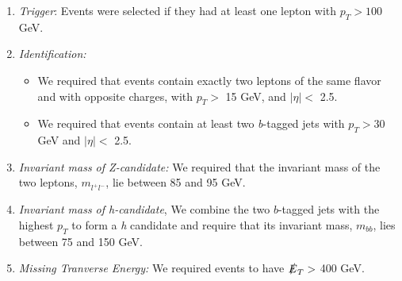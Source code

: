 \begin{enumerate}
\item \emph{Trigger}: Events were selected if they had at least one lepton with $p_{T} > 100$ GeV. 
\item \emph{Identification:}
  \begin{itemize}
  \item We required that events contain exactly two leptons of the same flavor and with opposite charges, with $p_{T} >$ 15 GeV, and $\vert\eta\vert <$ 2.5.
  \item We required that events contain at least two \emph{b}-tagged jets with $p_{T} > 30$ GeV and $\vert\eta\vert <$ 2.5.
  \end{itemize}
\item \emph{Invariant mass of \emph{Z}-candidate:} We required that the invariant mass of the two leptons, $m_{l^{+}l^{-}}$, lie between 85 and 95 GeV.
\item \emph{Invariant mass of \emph{h}-candidate}, We combine the two $b$-tagged jets with the highest $p_{T}$ to form a \emph{h} candidate and require that its invariant mass, $m_{bb}$, lies between 75 and 150 GeV.
\item \emph{Missing Tranverse Energy:} We required events to have $\slashed{E}_T >$ 400 GeV.


\end{enumerate}
